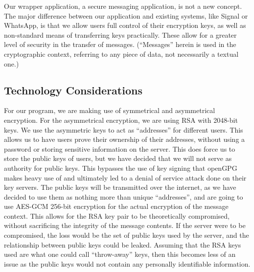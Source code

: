 \documentclass[11pt]{article}
\begin{document}
Our wrapper application, a secure messaging application, is not a new concept. The major difference between our application and existing systems, like Signal or WhatsApp, is that we allow users full control of their encryption keys, as well as non-standard means of transferring keys practically. These allow for a greater level of security in the transfer of messages. (“Messages” herein is used in the cryptographic context, referring to any piece of data, not necessarily a textual one.)

\subsection{Technology Considerations}
For our program, we are making use of symmetrical and asymmetrical encryption. For the asymmetrical encryption, we are using RSA with 2048-bit keys. We use the asymmetric keys to act as “addresses” for different users. This allows us to have users prove their ownership of their addresses, without using a password or storing sensitive information on the server. This does force us to store the public keys of users, but we have decided that we will not serve as authority for public keys. This bypasses the use of key signing that openGPG makes heavy use of and ultimately led to a denial of service attack done on their key servers. The public keys will be transmitted over the internet, as we have decided to use them as nothing more than unique “addresses”, and are going to use AES-GCM 256-bit encryption for the actual encryption of the message context. This allows for the RSA key pair to be theoretically compromised, without sacrificing the integrity of the message contents. If the server were to be compromised, the loss would be the set of public keys used by the server, and the relationship between public keys could be leaked. Assuming that the RSA keys used are what one could call “throw-away” keys, then this becomes less of an issue as the public keys would not contain any personally identifiable information.\\
\end{document}
